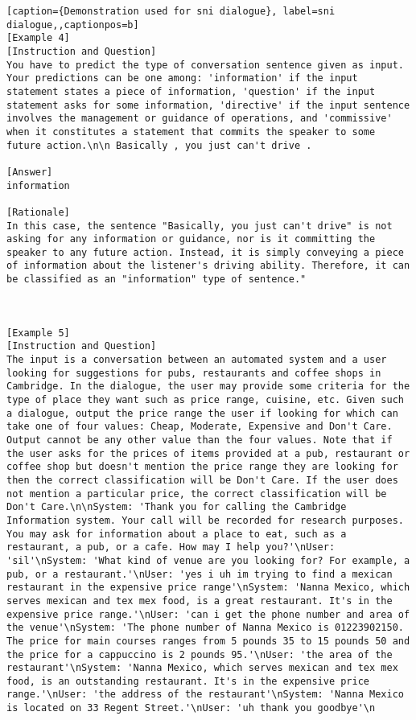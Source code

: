 \begin{lstlisting}[caption={Demonstration used for sni dialogue}, label=sni dialogue,,captionpos=b]
[Example 4]
[Instruction and Question]
You have to predict the type of conversation sentence given as input. Your predictions can be one among: 'information' if the input statement states a piece of information, 'question' if the input statement asks for some information, 'directive' if the input sentence involves the management or guidance of operations, and 'commissive' when it constitutes a statement that commits the speaker to some future action.\n\n Basically , you just can't drive . 

[Answer]
information

[Rationale]
In this case, the sentence "Basically, you just can't drive" is not asking for any information or guidance, nor is it committing the speaker to any future action. Instead, it is simply conveying a piece of information about the listener's driving ability. Therefore, it can be classified as an "information" type of sentence."



[Example 5]
[Instruction and Question]
The input is a conversation between an automated system and a user looking for suggestions for pubs, restaurants and coffee shops in Cambridge. In the dialogue, the user may provide some criteria for the type of place they want such as price range, cuisine, etc. Given such a dialogue, output the price range the user if looking for which can take one of four values: Cheap, Moderate, Expensive and Don't Care. Output cannot be any other value than the four values. Note that if the user asks for the prices of items provided at a pub, restaurant or coffee shop but doesn't mention the price range they are looking for then the correct classification will be Don't Care. If the user does not mention a particular price, the correct classification will be Don't Care.\n\nSystem: 'Thank you for calling the Cambridge Information system. Your call will be recorded for research purposes. You may ask for information about a place to eat, such as a restaurant, a pub, or a cafe. How may I help you?'\nUser: 'sil'\nSystem: 'What kind of venue are you looking for? For example, a pub, or a restaurant.'\nUser: 'yes i uh im trying to find a mexican restaurant in the expensive price range'\nSystem: 'Nanna Mexico, which serves mexican and tex mex food, is a great restaurant. It's in the expensive price range.'\nUser: 'can i get the phone number and area of the venue'\nSystem: 'The phone number of Nanna Mexico is 01223902150. The price for main courses ranges from 5 pounds 35 to 15 pounds 50 and the price for a cappuccino is 2 pounds 95.'\nUser: 'the area of the restaurant'\nSystem: 'Nanna Mexico, which serves mexican and tex mex food, is an outstanding restaurant. It's in the expensive price range.'\nUser: 'the address of the restaurant'\nSystem: 'Nanna Mexico is located on 33 Regent Street.'\nUser: 'uh thank you goodbye'\n


\end{lstlisting}
